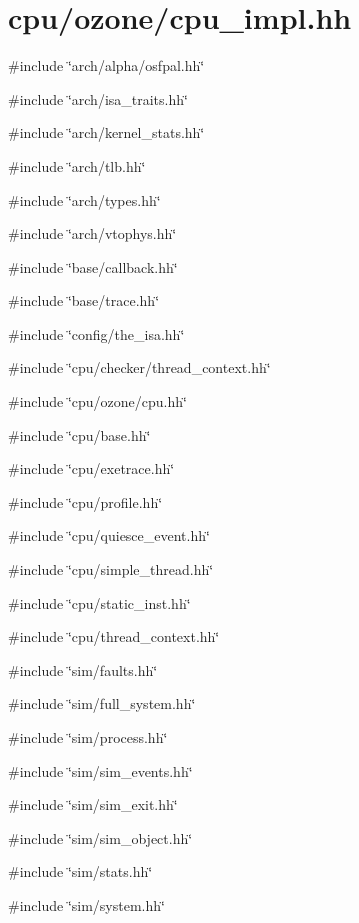 \hypertarget{ozone_2cpu__impl_8hh}{
\section{cpu/ozone/cpu\_\-impl.hh}
\label{ozone_2cpu__impl_8hh}
}
{\ttfamily \#include \char`\"{}arch/alpha/osfpal.hh\char`\"{}}\par
{\ttfamily \#include \char`\"{}arch/isa\_\-traits.hh\char`\"{}}\par
{\ttfamily \#include \char`\"{}arch/kernel\_\-stats.hh\char`\"{}}\par
{\ttfamily \#include \char`\"{}arch/tlb.hh\char`\"{}}\par
{\ttfamily \#include \char`\"{}arch/types.hh\char`\"{}}\par
{\ttfamily \#include \char`\"{}arch/vtophys.hh\char`\"{}}\par
{\ttfamily \#include \char`\"{}base/callback.hh\char`\"{}}\par
{\ttfamily \#include \char`\"{}base/trace.hh\char`\"{}}\par
{\ttfamily \#include \char`\"{}config/the\_\-isa.hh\char`\"{}}\par
{\ttfamily \#include \char`\"{}cpu/checker/thread\_\-context.hh\char`\"{}}\par
{\ttfamily \#include \char`\"{}cpu/ozone/cpu.hh\char`\"{}}\par
{\ttfamily \#include \char`\"{}cpu/base.hh\char`\"{}}\par
{\ttfamily \#include \char`\"{}cpu/exetrace.hh\char`\"{}}\par
{\ttfamily \#include \char`\"{}cpu/profile.hh\char`\"{}}\par
{\ttfamily \#include \char`\"{}cpu/quiesce\_\-event.hh\char`\"{}}\par
{\ttfamily \#include \char`\"{}cpu/simple\_\-thread.hh\char`\"{}}\par
{\ttfamily \#include \char`\"{}cpu/static\_\-inst.hh\char`\"{}}\par
{\ttfamily \#include \char`\"{}cpu/thread\_\-context.hh\char`\"{}}\par
{\ttfamily \#include \char`\"{}sim/faults.hh\char`\"{}}\par
{\ttfamily \#include \char`\"{}sim/full\_\-system.hh\char`\"{}}\par
{\ttfamily \#include \char`\"{}sim/process.hh\char`\"{}}\par
{\ttfamily \#include \char`\"{}sim/sim\_\-events.hh\char`\"{}}\par
{\ttfamily \#include \char`\"{}sim/sim\_\-exit.hh\char`\"{}}\par
{\ttfamily \#include \char`\"{}sim/sim\_\-object.hh\char`\"{}}\par
{\ttfamily \#include \char`\"{}sim/stats.hh\char`\"{}}\par
{\ttfamily \#include \char`\"{}sim/system.hh\char`\"{}}\par
